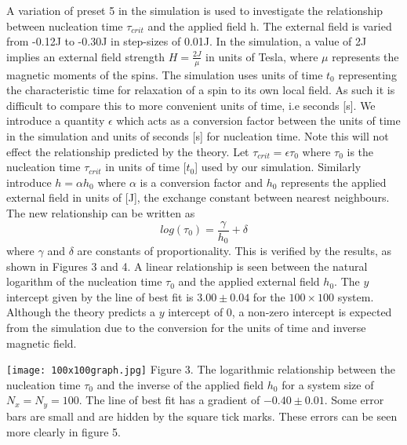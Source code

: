 \documentclass{article}
\begin{document}
\begin{multicols*}{2}
A variation of preset 5 \cite{SSS} in the simulation is used to investigate the relationship between nucleation time $\tau_{crit}$ and the applied field h. The external field is varied from -0.12J to -0.30J in step-sizes of 0.01J. In the simulation, a value of 2J implies an external field strength $H = \frac{2J}{\mu}$ in units of Tesla, where $\mu$ represents the magnetic moments of the spins. The simulation uses units of time $t_{0}$ representing the characteristic time for relaxation of a spin to its own local field. As such it is difficult to compare this to more convenient units of time, i.e seconds [s]. We introduce a quantity $\epsilon$ which acts as a conversion factor between the units of time in the simulation and units of seconds [s] for nucleation time. Note this will not effect the relationship predicted by the theory. Let $\tau_{crit}=\epsilon\tau_{0}$ where $\tau_{0}$ is the nucleation time $\tau_{crit}$ in units of time [$t_{0}$] used by our simulation. Similarly introduce $h = \alpha h_{0}$ where $\alpha$ is a conversion factor and $h_{0}$ represents the applied external field in units of [J], the exchange constant between nearest neighbours. The new relationship can be written as
\begin{equation}\label{empirical log equation}
log(\tau_{0})=\frac{\gamma}{h_{0}}+ \delta
\end{equation}
where $\gamma$ and $\delta$ are constants of proportionality. This is verified by the results, as shown in Figures 3 and 4. A linear relationship is seen between the natural logarithm of the nucleation time $\tau_{0}$ and the applied external field $h_{0}$. The $y$ intercept given by the line of best fit is $3.00\pm0.04$ for the $100 \times 100$ system. Although the theory predicts a $y$ intercept of 0, a non-zero intercept is expected from the simulation due to the conversion for the units of time and inverse magnetic field. \newline

\newline
\begin{Figure}
\centering
\texttt{[image: 100x100graph.jpg]}
\footnotesize
Figure 3. The logarithmic relationship between the nucleation time $\tau_{0}$ and the inverse of the applied field $h_{0}$ for a system size of $N_{x} = N_{y} = 100$. The line of best fit has a gradient of $-0.40 \pm 0.01$. Some error bars are small and are hidden by the square tick marks. These errors can be seen more clearly in figure 5.
\end{Figure}
\normalsize


\end{multicols*}
\end{document}
